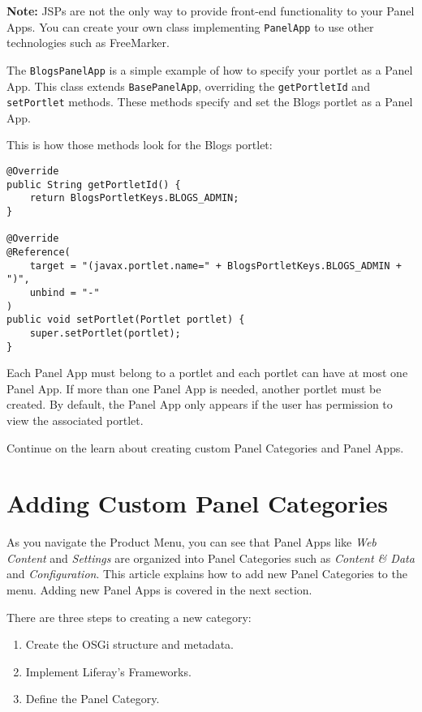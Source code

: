 \noindent\hrulefill

\textbf{Note:} JSPs are not the only way to provide front-end
functionality to your Panel Apps. You can create your own class
implementing \texttt{PanelApp} to use other technologies such as
FreeMarker.

\noindent\hrulefill

The \texttt{BlogsPanelApp} is a simple example of how to specify your
portlet as a Panel App. This class extends \texttt{BasePanelApp},
overriding the \texttt{getPortletId} and \texttt{setPortlet} methods.
These methods specify and set the Blogs portlet as a Panel App.

This is how those methods look for the Blogs portlet:

\begin{verbatim}
@Override
public String getPortletId() {
    return BlogsPortletKeys.BLOGS_ADMIN;
}

@Override
@Reference(
    target = "(javax.portlet.name=" + BlogsPortletKeys.BLOGS_ADMIN + ")",
    unbind = "-"
)
public void setPortlet(Portlet portlet) {
    super.setPortlet(portlet);
}
\end{verbatim}

Each Panel App must belong to a portlet and each portlet can have at
most one Panel App. If more than one Panel App is needed, another
portlet must be created. By default, the Panel App only appears if the
user has permission to view the associated portlet.

Continue on the learn about creating custom Panel Categories and Panel
Apps.

\chapter{Adding Custom Panel
Categories}\label{adding-custom-panel-categories}

As you navigate the Product Menu, you can see that Panel Apps like
\emph{Web Content} and \emph{Settings} are organized into Panel
Categories such as \emph{Content \& Data} and \emph{Configuration}. This
article explains how to add new Panel Categories to the menu. Adding new
Panel Apps is covered in the next section.

There are three steps to creating a new category:

\begin{enumerate}
\def\labelenumi{\arabic{enumi}.}
\item
  Create the OSGi structure and metadata.
\item
  Implement Liferay's Frameworks.
\item
  Define the Panel Category.
\end{enumerate}

